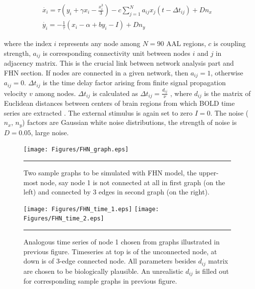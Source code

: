 \begin{subequations}
 \begin{align}\dot{x_i} = \tau (y_i + \gamma x_i - \frac{x_i^3}{3}) -c \sum_{j=1}^N a_{ij}x_j(t - \Delta t_{ij}) +Dn_x \label{eqn: frobenius 17}\\  \dot{y_i} = -\frac{1}{\tau} (x_i - \alpha + b y_i - I ) +Dn_y \label{eqn: frobenius 18}   \end{align} 
\end{subequations}

where the index $i$ represents any node among $N=90$ AAL regions, $c$ is coupling strength, $a_{ij}$ is corresponding connectivity unit between nodes $i$ and $j$ in adjacency matrix. This is the crucial link between network analysis part and FHN section. If nodes are connected in a given network, then $a_{ij}=1$, otherwise $a_{ij}=0$. $\Delta t_{ij}$ is the time delay factor arising from finite signal propagation velocity $v$ among nodes. $\Delta t_{ij}$ is calculated as $\Delta t_{ij}=\frac{d_{ij}}{\nu}$ \citep{GHO08, GHO08a, DEC09}, where $d_{ij}$ is the matrix of Euclidean distances between centers of brain regions from which BOLD time series are extracted \citep{KAI06}. The external stimulus is again set to zero $I=0$. The noise ($n_x$, $n_y$) factors are Gaussian white noise distributions, the strength of noise is $D=0.05$, large noise.
 
\begin{figure}[htbp]
  \centering
	\texttt{[image: Figures/FHN\_graph.eps]}
 
    \rule{35em}{0.5pt}
    \caption[FHN Graph]{Two sample graphs to be simulated with FHN model, the upper-most node, say node 1 is not connected at all in first graph (on the left) and connected by 3 edges in second graph (on the right).  }
  \label{fig:FHN Graph}	
\end{figure}


\begin{figure}[htbp]
  \centering
	\texttt{[image: Figures/FHN\_time\_1.eps]}
 	\texttt{[image: Figures/FHN\_time\_2.eps]}
    \rule{35em}{0.5pt}
    \caption[FHN Time Series]{Analogous time series of node 1 chosen from graphs illustrated in previous figure. Timeseries at top is of the unconnected node, at down is of 3-edge connected node. All parameters besides $d_{ij}$ matrix are chosen to be biologically plausible. An unrealistic $d_{ij}$ is filled out for corresponding sample graphs in previous figure.  }
  \label{fig:FHN Time Series}	
\end{figure}

